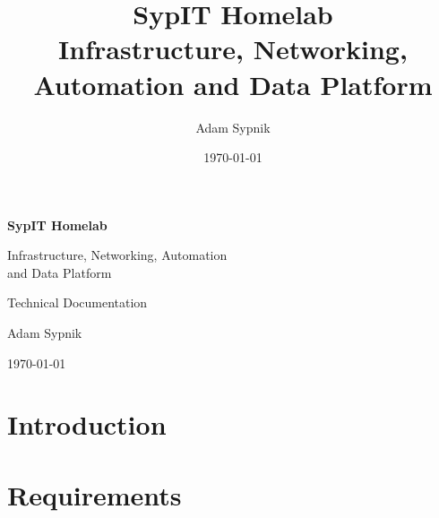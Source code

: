 \documentclass[12pt,a4paper]{report}
\title{
    \textbf{SypIT Homelab}\\[0.5cm]
    \Large Infrastructure, Networking, Automation and Data Platform
}
\author{Adam Sypnik}
\date{\today}
\begin{document}

\begin{titlepage}
    \centering

    \vspace*{3cm}

    {\Huge\bfseries SypIT Homelab\par}

    \vspace{0.8cm}

    {\Large
    Infrastructure, Networking, Automation\\
    and Data Platform
    \par}

    \vspace{2cm}

    {\large Technical Documentation\par}

    \vfill

    {\large Adam Sypnik\par}

    \vspace{0.5cm}

    {\large \today\par}

    \vspace{2cm}
\end{titlepage}



\tableofcontents
\clearpage

\listoffigures
\clearpage

\listoftables
\clearpage



\chapter{Introduction}


\chapter{Requirements}

\end{document}
